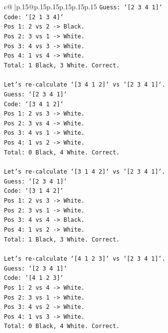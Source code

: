 \documentclass{article}
\begin{document}
{\begin{supertabular}{c@{$\;$}|p{.15\linewidth}@{}p{.15\linewidth}p{.15\linewidth}p{.15\linewidth}p{.15\linewidth}p{.15\linewidth}}
{{{\texttt{Guess: `{[}2 3 4 1{]}`} \\
\texttt{Code: `{[}2 1 3 4{]}`} \\
\texttt{Pos 1: 2 vs 2 {-}> Black.} \\
\texttt{Pos 2: 3 vs 1 {-}> White.} \\
\texttt{Pos 3: 4 vs 3 {-}> White.} \\
\texttt{Pos 4: 1 vs 4 {-}> White.} \\
\texttt{Total: 1 Black, 3 White. Correct.} \\
\\ 
\texttt{Let's re{-}calculate `{[}3 4 1 2{]}` vs `{[}2 3 4 1{]}`.} \\
\texttt{Guess: `{[}2 3 4 1{]}`} \\
\texttt{Code: `{[}3 4 1 2{]}`} \\
\texttt{Pos 1: 2 vs 3 {-}> White.} \\
\texttt{Pos 2: 3 vs 4 {-}> White.} \\
\texttt{Pos 3: 4 vs 1 {-}> White.} \\
\texttt{Pos 4: 1 vs 2 {-}> White.} \\
\texttt{Total: 0 Black, 4 White. Correct.} \\
\\ 
\texttt{Let's re{-}calculate `{[}3 1 4 2{]}` vs `{[}2 3 4 1{]}`.} \\
\texttt{Guess: `{[}2 3 4 1{]}`} \\
\texttt{Code: `{[}3 1 4 2{]}`} \\
\texttt{Pos 1: 2 vs 3 {-}> White.} \\
\texttt{Pos 2: 3 vs 1 {-}> White.} \\
\texttt{Pos 3: 4 vs 4 {-}> Black.} \\
\texttt{Pos 4: 1 vs 2 {-}> White.} \\
\texttt{Total: 1 Black, 3 White. Correct.} \\
\\ 
\texttt{Let's re{-}calculate `{[}4 1 2 3{]}` vs `{[}2 3 4 1{]}`.} \\
\texttt{Guess: `{[}2 3 4 1{]}`} \\
\texttt{Code: `{[}4 1 2 3{]}`} \\
\texttt{Pos 1: 2 vs 4 {-}> White.} \\
\texttt{Pos 2: 3 vs 1 {-}> White.} \\
\texttt{Pos 3: 4 vs 2 {-}> White.} \\
\texttt{Pos 4: 1 vs 3 {-}> White.} \\
\texttt{Total: 0 Black, 4 White. Correct.} \\
}}}
\end{supertabular}}
\end{document}
